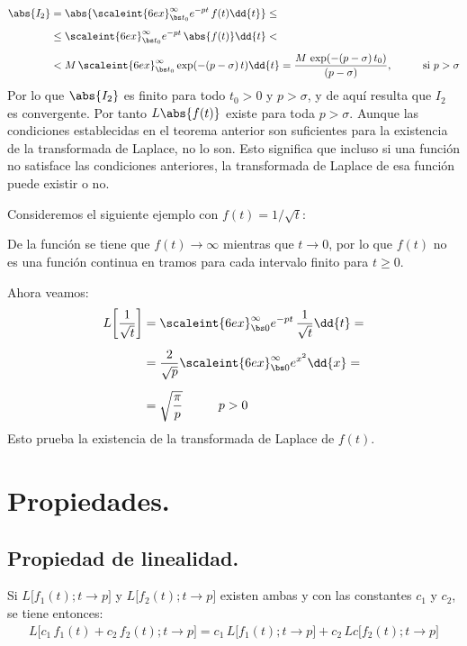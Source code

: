 \begin{align*}
\abs{I_{2}} &= \abs{\scaleint{6ex}_{\bs t_{0}}^{\infty} e^{- p t} \, f(t) \dd{t}} \leq \\[0.5em]
&\leq \scaleint{6ex}_{\bs t_{0}}^{\infty} e^{- p t} \, \abs{f(t)} \dd{t} < \\[0.5em]
&< M \, \scaleint{6ex}_{\bs t_{0}}^{\infty} \exp(-(p - \sigma) \, t) \dd{t} = \dfrac{M \, \exp(-(p - \sigma) \, t_{0})}{(p - \sigma)}, \hspace{1cm} \mbox{si  } p > \sigma
\end{align*}
Por lo que $\abs{I_{2}}$ es finito para todo $t_{0} > 0$ y $p > \sigma$, y de aquí resulta que $I_{2}$ es convergente. Por tanto $L\abs{f(t)}$ existe para toda $p > \sigma$.
Aunque las condiciones establecidas en el teorema anterior son suficientes para la existencia de la transformada de Laplace, no lo son. Esto significa que incluso si una función no satisface las condiciones anteriores, la transformada de Laplace de esa función puede existir o no. 
\par
Consideremos el siguiente ejemplo con $f(t) = 1 / \sqrt{t}$:
\par
De la función se tiene que $f(t) \to \infty$ mientras que $t \to 0$, por lo que $f(t)$ no es una función continua en tramos para cada intervalo finito para $t \geq 0$.
\par
Ahora veamos:
\begin{align*}
L \bigg[ \dfrac{1}{\sqrt{t}} \bigg] &= \scaleint{6ex}_{\bs 0}^{\infty} e^{-p t} \, \dfrac{1}{\sqrt{t}} \dd{t} = \\[0.5em]
&= \dfrac{2}{\sqrt{p}} \scaleint{6ex}_{\bs 0}^{\infty} e^{x^{2}} \dd{x} = \\[0.5em]
&= \sqrt{\dfrac{\pi}{p}} \hspace{1cm} p > 0
\end{align*}
Esto prueba la existencia de la transformada de Laplace de $f(t)$.

\section{Propiedades.}

\subsection{Propiedad de linealidad.}

Si $L \big[f_{1}(t); t \to p\big]$ y $L \big[f_{2}(t); t \to p\big]$ existen ambas y con las constantes $c_{1}$ y $c_{2}$, se tiene entonces:
\begin{align*}
L \big[c_{1} \, f_{1}(t) + c_{2} \, f_{2}(t) ; t \to p\big] = c_{1} \, L \big[f_{1}(t); t \to p\big] + c_{2} \, L c\big[f_{2}(t); t \to p\big]
\end{align*}


